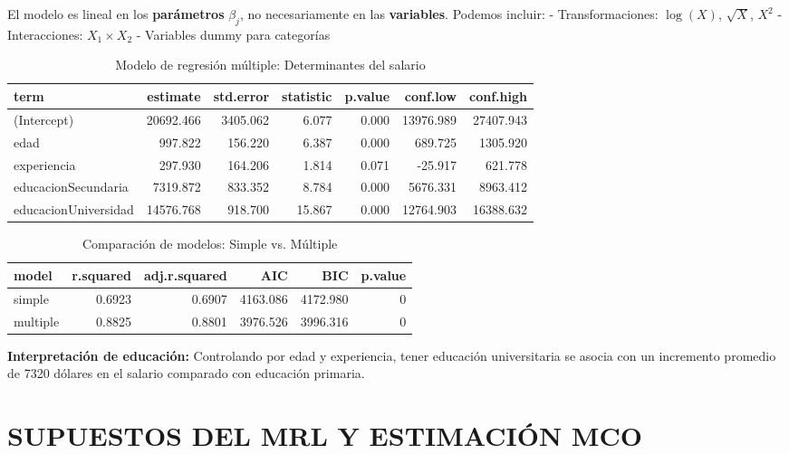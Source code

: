 \documentclass[
  oneside]{book}
\begin{document}
El modelo es lineal en los \textbf{parámetros} \(\beta_j\), no necesariamente en las \textbf{variables}. Podemos incluir:
- Transformaciones: \(\log(X)\), \(\sqrt{X}\), \(X^2\)
- Interacciones: \(X_1 \times X_2\)
- Variables dummy para categorías

\begin{table}
\centering
\caption{\label{tab:regresion-multiple}Modelo de regresión múltiple: Determinantes del salario}
\centering
\begin{tabular}[t]{l|r|r|r|r|r|r}
\hline
term & estimate & std.error & statistic & p.value & conf.low & conf.high\\
\hline
(Intercept) & 20692.466 & 3405.062 & 6.077 & 0.000 & 13976.989 & 27407.943\\
\hline
edad & 997.822 & 156.220 & 6.387 & 0.000 & 689.725 & 1305.920\\
\hline
experiencia & 297.930 & 164.206 & 1.814 & 0.071 & -25.917 & 621.778\\
\hline
educacionSecundaria & 7319.872 & 833.352 & 8.784 & 0.000 & 5676.331 & 8963.412\\
\hline
educacionUniversidad & 14576.768 & 918.700 & 15.867 & 0.000 & 12764.903 & 16388.632\\
\hline
\end{tabular}
\end{table}

\begin{table}
\centering
\caption{\label{tab:regresion-multiple}Comparación de modelos: Simple vs. Múltiple}
\centering
\begin{tabular}[t]{l|r|r|r|r|r}
\hline
model & r.squared & adj.r.squared & AIC & BIC & p.value\\
\hline
simple & 0.6923 & 0.6907 & 4163.086 & 4172.980 & 0\\
\hline
multiple & 0.8825 & 0.8801 & 3976.526 & 3996.316 & 0\\
\hline
\end{tabular}
\end{table}

\textbf{Interpretación de educación:} Controlando por edad y experiencia, tener educación universitaria se asocia con un incremento promedio de 7320 dólares en el salario comparado con educación primaria.

\section{SUPUESTOS DEL MRL Y ESTIMACIÓN MCO}\label{supuestos-del-mrl-y-estimaciuxf3n-mco}
\end{document}
